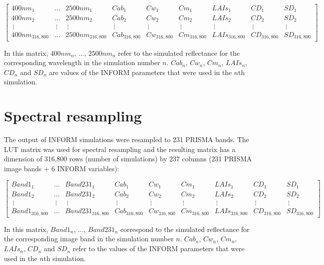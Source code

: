 \documentclass[a4paper, twoside]{templates/ociamthesis}
\begin{document}
\begingroup
\tiny

\[
\begin{bmatrix}
400nm_{1} & \dots & 2500nm_{1} & Cab_{1} & Cw_{1} & Cm_{1} & LAIs_{1} & CD_{1} & SD_{1}\\
400nm_{2} & \dots & 2500nm_{2} & Cab_{2} & Cw_{2} & Cm_{2} & LAIs_{2} & CD_{2} & SD_{2}\\
\ \vdots  &\ \vdots &\ \vdots &\ \vdots &\ \vdots &\ \vdots &\ \vdots &\ \vdots &\ \vdots\\
400nm_{316,800} & \dots & 2500nm_{316,800} & Cab_{316,800} & Cw_{316,800} & Cm_{316,800} & LAIs_{316,800} & CD_{316,800} & SD_{316,800}
\end{bmatrix}
\]
\endgroup

In this matrix, \(400nm_{n}\), \(\dots\), \(2500nm_{n}\) refer to the simulated reflectance for the corresponding wavelength in the simulation number \(n\). \(Cab_{n}\), \(Cw_{n}\), \(Cm_{n}\), \(LAIs_{n}\), \(CD_{n}\) and \(SD_{n}\) are values of the INFORM parameters that were used in the \(n\)th simulation.

\hypertarget{spectral-resampling-1}{%
\section{Spectral resampling}\label{spectral-resampling-1}}

The output of INFORM simulations were resampled to 231 PRISMA bands. The LUT matrix was used for spectral resampling and the resulting matrix has a dimension of 316,800 rows (number of simulations) by 237 columns (231 PRISMA image bands + 6 INFORM variables):

\begingroup
\tiny

\[
\begin{bmatrix}
Band1_{1} & \dots & Band231_{1} & Cab_{1} & Cw_{1} & Cm_{1} & LAIs_{1} & CD_{1} & SD_{1}\\
Band1_{2} & \dots & Band231_{2} & Cab_{2} & Cw_{2} & Cm_{2} & LAIs_{2} & CD_{2} & SD_{2}\\
\ \vdots  &\ \vdots &\ \vdots &\ \vdots &\ \vdots &\ \vdots &\ \vdots &\ \vdots &\ \vdots\\
Band1_{316,800} & \dots & Band231_{316,800} & Cab_{316,800} & Cw_{316,800} & Cm_{316,800} & LAIs_{316,800} & CD_{316,800} & SD_{316,800}
\end{bmatrix}
\]
\endgroup

In this matrix, \(Band1_{n}\), \(\dots\), \(Band231_{n}\) correspond to the simulated reflectance for the corresponding image band in the simulation number \(n\). \(Cab_{n}\), \(Cw_{n}\), \(Cm_{n}\), \(LAIs_{n}\), \(CD_{n}\) and \(SD_{n}\) refer to the values of the INFORM parameters that were used in the \(n\)th simulation.
\end{document}
